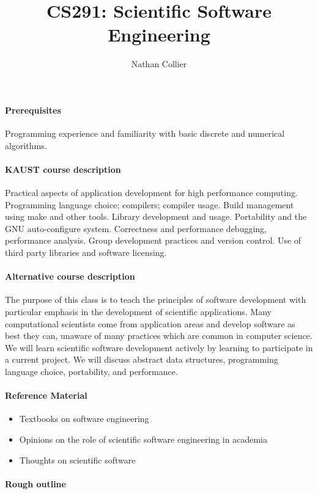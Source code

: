 \documentclass[12 pt]{article}
\title{CS291: Scientific Software Engineering}
\author{Nathan Collier}
\begin{document}
\maketitle
\paragraph{Prerequisites} Programming experience and familiarity with basic discrete and numerical algorithms.

\paragraph{KAUST course description}

Practical aspects of application development for high performance
computing. Programming language choice; compilers; compiler
usage. Build management using make and other tools. Library
development and usage. Portability and the GNU auto-configure
system. Correctness and performance debugging, performance
analysis. Group development practices and version control. Use of
third party libraries and software licensing.

\paragraph{Alternative course description}

The purpose of this class is to teach the principles of software
development with particular emphasis in the development of scientific
applications. Many computational scientists come from application
areas and develop software as best they can, unaware of many practices
which are common in computer science. We will learn scientific
software development actively by learning to participate in a current
project. We will discuss abstract data structures, programming
language choice, portability, and performance.

\paragraph{Reference Material}

\begin{itemize}
\item Textbooks on software engineering \cite{Sommerville2011,Nanz2011}
\item Opinions on the role of scientific software engineering in academia \cite{Todorov2012,Dirk2012}
\item Thoughts on scientific software \cite{Katzgraber2010,Hannay2009,Smith2007}
\end{itemize}

\paragraph{Rough outline}


 
\end{document}
